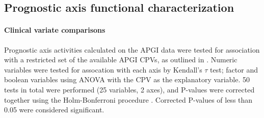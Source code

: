 \documentclass[dissertation.tex]{subfiles}
\begin{document}
\subsection{Prognostic axis functional characterization}
\paragraph{Clinical variate comparisons}
Prognostic axis activities calculated on the \gls{APGI} data were tested for association with a restricted set of the available \gls{APGI} \glspl{CPV}, as outlined in .  Numeric variables were tested for assocation with each axis by Kendall's $\tau$ test; factor and boolean variables using ANOVA with the \gls{CPV} as the explanatory variable.  50 tests in total were performed (25 variables, 2 axes), and P-values were corrected together using the Holm-Bonferroni procedure \cite{Holm1979}.  Corrected P-values of less than 0.05 were considered significant.
\end{document}
